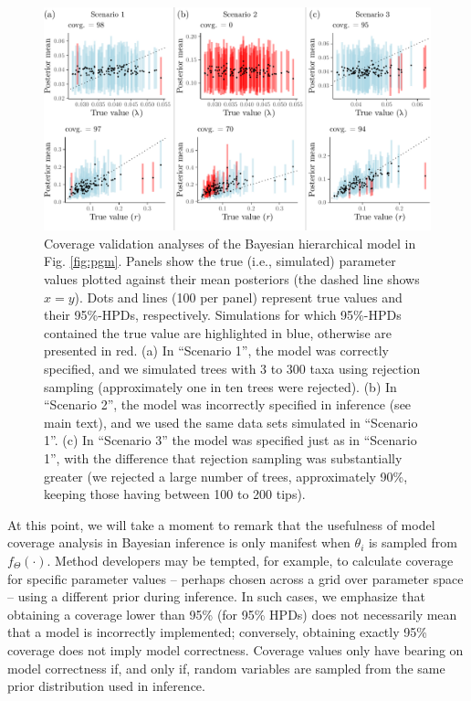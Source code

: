 \documentclass[oneside]{article}
\begin{document}
\begin{figure}
  \includegraphics[width=\textwidth]{../figures/graphical_model_coverage.pdf}
  \caption{
    Coverage validation analyses of the Bayesian hierarchical model in Fig. \ref{fig:pgm}.
    Panels show the true (i.e., simulated) parameter values plotted against their mean posteriors (the dashed line shows $x = y$).
    Dots and lines (100 per panel) represent true values and their 95\%-HPDs, respectively.
    Simulations for which 95\%-HPDs contained the true value are highlighted in blue, otherwise are presented in red.
    (a) In ``Scenario 1'', the model was correctly specified, and we simulated trees with 3 to 300 taxa using rejection sampling (approximately one in ten trees were rejected).
    (b) In ``Scenario 2'', the model was incorrectly specified in inference (see main text), and we used the same data sets simulated in ``Scenario 1''.
    (c) In ``Scenario 3'' the model was specified just as in ``Scenario 1'', with the difference that rejection sampling was substantially greater (we rejected a large number of trees, approximately 90\%, keeping those having between 100 to 200 tips).
  }
  \label{fig:yulecalval}
\end{figure}

At this point, we will take a moment to remark that the usefulness of model coverage analysis in Bayesian inference is only manifest when $\theta_i$ is sampled from $f_\Theta(\cdot)$.
Method developers may be tempted, for example, to calculate coverage for specific parameter values -- perhaps chosen across a grid over parameter space -- using a different prior during inference.
In such cases, we emphasize that obtaining a coverage lower than 95\% (for 95\% HPDs) does not necessarily mean that a model is incorrectly implemented; conversely, obtaining exactly 95\% coverage does not imply model correctness.
Coverage values only have bearing on model correctness if, and only if, random variables are sampled from the same prior distribution used in inference. 
\end{document}
